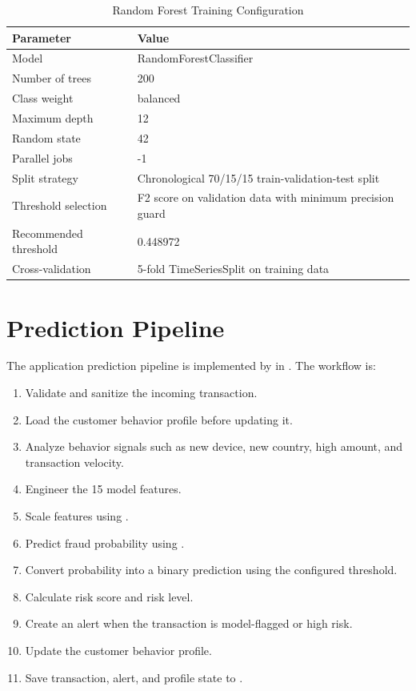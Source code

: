 \documentclass[12pt,a4paper]{report}
\begin{document}
\begin{table}[H]
\centering
\caption{Random Forest Training Configuration}
\begin{tabular}{ll}
\toprule
\textbf{Parameter} & \textbf{Value} \\
\midrule
Model & RandomForestClassifier \\
Number of trees & 200 \\
Class weight & balanced \\
Maximum depth & 12 \\
Random state & 42 \\
Parallel jobs & -1 \\
Split strategy & Chronological 70/15/15 train-validation-test split \\
Threshold selection & F2 score on validation data with minimum precision guard \\
Recommended threshold & 0.448972 \\
Cross-validation & 5-fold TimeSeriesSplit on training data \\
\bottomrule
\end{tabular}
\end{table}

\section{Prediction Pipeline}
The application prediction pipeline is implemented by  in . The workflow is:
\begin{enumerate}
    \item Validate and sanitize the incoming transaction.
    \item Load the customer behavior profile before updating it.
    \item Analyze behavior signals such as new device, new country, high amount, and transaction velocity.
    \item Engineer the 15 model features.
    \item Scale features using .
    \item Predict fraud probability using .
    \item Convert probability into a binary prediction using the configured threshold.
    \item Calculate risk score and risk level.
    \item Create an alert when the transaction is model-flagged or high risk.
    \item Update the customer behavior profile.
    \item Save transaction, alert, and profile state to .
\end{enumerate}
\end{document}
